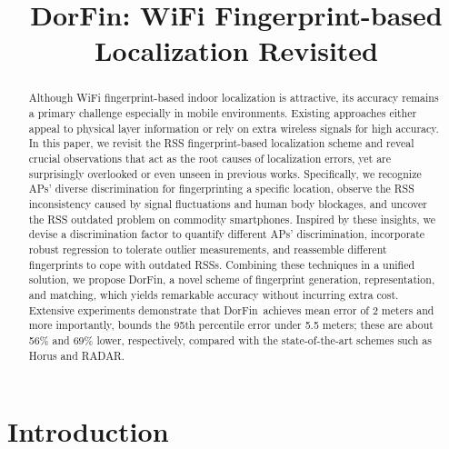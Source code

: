 \documentclass[10pt,conference,compsocconf,letterpaper]{./sty/IEEEtran}
\def\sysname{DorFin}
\begin{document}
\title{DorFin: WiFi Fingerprint-based Localization Revisited
}
\author{ 
}

\maketitle

\begin{abstract} 
Although WiFi fingerprint-based indoor localization is attractive, its accuracy remains a primary challenge especially in mobile environments. Existing approaches either appeal to physical layer information or rely on extra wireless signals for high accuracy. 
In this paper, we revisit the RSS fingerprint-based localization scheme and reveal crucial observations that act as the root causes of localization errors, yet are surprisingly overlooked or even unseen in previous works. Specifically, we recognize APs' diverse discrimination for fingerprinting a specific location, observe the RSS inconsistency caused by signal fluctuations and human body blockages, and uncover the RSS outdated problem on commodity smartphones. 
Inspired by these insights, we devise a discrimination factor to quantify different APs' discrimination, incorporate robust regression to tolerate outlier measurements, and reassemble different fingerprints to cope with outdated RSSs. 
Combining these techniques in a unified solution, we propose \sysname, a novel scheme of fingerprint generation, representation, and matching, which yields remarkable accuracy without incurring extra cost. 
Extensive experiments demonstrate that \sysname~achieves mean error of 2 meters and more importantly, bounds the 95th percentile error under 5.5 meters; these are about 56\% and 69\% lower, respectively, compared with the state-of-the-art schemes such as Horus and RADAR. 




\end{abstract}

\section{Introduction}
\end{document}
